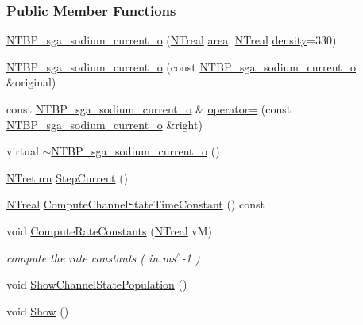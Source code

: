 \subsubsection*{Public Member Functions}
\begin{DoxyCompactItemize}
\item 
\hyperlink{class_n_t_b_p__sga__sodium__current__o_a1016cfb98e11f0ed1979526cf66e2f52}{NTBP\_\-sga\_\-sodium\_\-current\_\-o} (\hyperlink{nt__types_8h_a814a97893e9deb1eedcc7604529ba80d}{NTreal} \hyperlink{class_n_t_b_p__channels__current__o_af88f0d6c8df84ab148c87484f39ee2b7}{area}, \hyperlink{nt__types_8h_a814a97893e9deb1eedcc7604529ba80d}{NTreal} \hyperlink{class_n_t_b_p__channels__current__o_a8f486ec47e3aeef298a33b735758aa9f}{density}=330)
\item 
\hyperlink{class_n_t_b_p__sga__sodium__current__o_aadbfe543d451e579f61d7e134875f20f}{NTBP\_\-sga\_\-sodium\_\-current\_\-o} (const \hyperlink{class_n_t_b_p__sga__sodium__current__o}{NTBP\_\-sga\_\-sodium\_\-current\_\-o} \&original)
\item 
const \hyperlink{class_n_t_b_p__sga__sodium__current__o}{NTBP\_\-sga\_\-sodium\_\-current\_\-o} \& \hyperlink{class_n_t_b_p__sga__sodium__current__o_a126c5ba8b9dbd64cce894efcb865aa57}{operator=} (const \hyperlink{class_n_t_b_p__sga__sodium__current__o}{NTBP\_\-sga\_\-sodium\_\-current\_\-o} \&right)
\item 
virtual \hyperlink{class_n_t_b_p__sga__sodium__current__o_a2c92e031a03042a8bcb24ee059c3d529}{$\sim$NTBP\_\-sga\_\-sodium\_\-current\_\-o} ()
\item 
\hyperlink{nt__types_8h_ab9564ee8f091e809d21b8451c6683c53}{NTreturn} \hyperlink{class_n_t_b_p__sga__sodium__current__o_a2f9bde751f01ca3a887193bcd83abbbb}{StepCurrent} ()
\item 
\hyperlink{nt__types_8h_a814a97893e9deb1eedcc7604529ba80d}{NTreal} \hyperlink{class_n_t_b_p__sga__sodium__current__o_a020e458cd09c10233e069ed7403f66d4}{ComputeChannelStateTimeConstant} () const 
\item 
void \hyperlink{class_n_t_b_p__sga__sodium__current__o_ac6451656566f5b4f924a2845db577915}{ComputeRateConstants} (\hyperlink{nt__types_8h_a814a97893e9deb1eedcc7604529ba80d}{NTreal} vM)
\begin{DoxyCompactList}\small\item\em compute the rate constants ( in ms$^\wedge$-\/1 ) \item\end{DoxyCompactList}\item 
void \hyperlink{class_n_t_b_p__sga__sodium__current__o_ade4dbb03c3666960786b0dd956b092a3}{ShowChannelStatePopulation} ()
\item 
void \hyperlink{class_n_t_b_p__sga__sodium__current__o_a0b8347cc224026d85cb80be8d850997c}{Show} ()
\end{DoxyCompactItemize}


